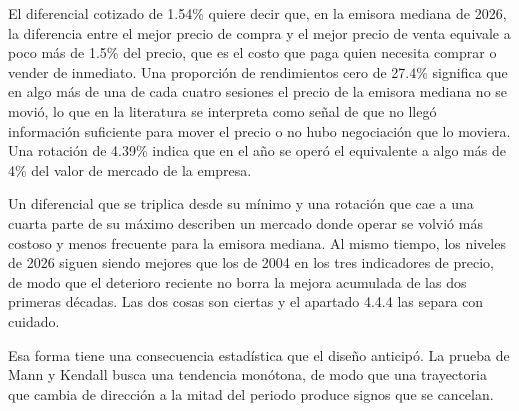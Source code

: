 El diferencial cotizado de 1.54\% quiere decir que, en la emisora mediana de 2026, la diferencia entre el mejor precio de compra y el mejor precio de venta equivale a poco más de 1.5\% del precio, que es el costo que paga quien necesita comprar o vender de inmediato. Una proporción de rendimientos cero de 27.4\% significa que en algo más de una de cada cuatro sesiones el precio de la emisora mediana no se movió, lo que en la literatura se interpreta como señal de que no llegó información suficiente para mover el precio o no hubo negociación que lo moviera. Una rotación de 4.39\% indica que en el año se operó el equivalente a algo más de 4\% del valor de mercado de la empresa.

Un diferencial que se triplica desde su mínimo y una rotación que cae a una cuarta parte de su máximo describen un mercado donde operar se volvió más costoso y menos frecuente para la emisora mediana. Al mismo tiempo, los niveles de 2026 siguen siendo mejores que los de 2004 en los tres indicadores de precio, de modo que el deterioro reciente no borra la mejora acumulada de las dos primeras décadas. Las dos cosas son ciertas y el apartado 4.4.4 las separa con cuidado.

Esa forma tiene una consecuencia estadística que el diseño anticipó. La prueba de Mann y Kendall busca una tendencia monótona, de modo que una trayectoria que cambia de dirección a la mitad del periodo produce signos que se cancelan.


